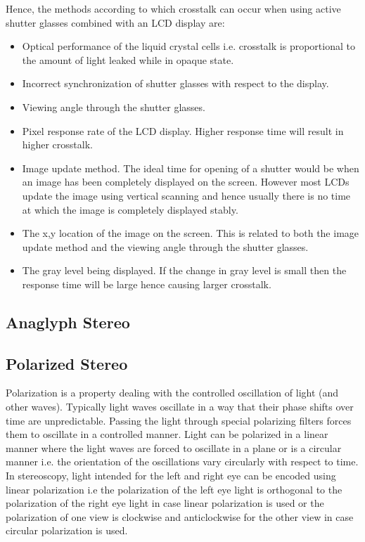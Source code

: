 Hence, the methods according to which crosstalk can occur when using active shutter glasses combined with an LCD display are:
\begin{itemize}
	\item{Optical performance of the liquid crystal cells i.e. crosstalk is proportional to the amount of light leaked while in opaque state.}
	\item{Incorrect synchronization of shutter glasses with respect to the display.}
	\item{Viewing angle through the shutter glasses.}
	\item{Pixel response rate of the LCD display. Higher response time will result in higher crosstalk.}
	\item{Image update method. The ideal time for opening of a shutter would be when an image has been completely displayed on the screen. However most LCDs update the image using vertical scanning and hence usually there is no time at which the image is completely displayed stably.}
	\item{The x,y location of the image on the screen. This is related to both the image update method and the viewing angle through the shutter glasses.}
	\item{The gray level being displayed. If the change in gray level is small then the response time will be large hence causing larger crosstalk. }
\end{itemize}

\subsection{Anaglyph Stereo}
\subsection{Polarized Stereo}
Polarization is a property dealing with the controlled oscillation of light (and other waves). Typically light waves oscillate in a way that their phase shifts over time are unpredictable. Passing the light through special polarizing filters forces them to oscillate in a controlled manner\cite{ wiki:polarizationwiki}. Light can be polarized in a linear manner where the light waves are forced to oscillate in a plane or is a circular manner i.e. the orientation of the oscillations vary circularly with respect to time. In stereoscopy, light intended for the left and right eye can be encoded using linear polarization i.e the polarization of the left eye light is orthogonal to the polarization of the right eye light in case linear polarization is used or the polarization of one view is clockwise and anticlockwise for the other view in case circular polarization is used.

